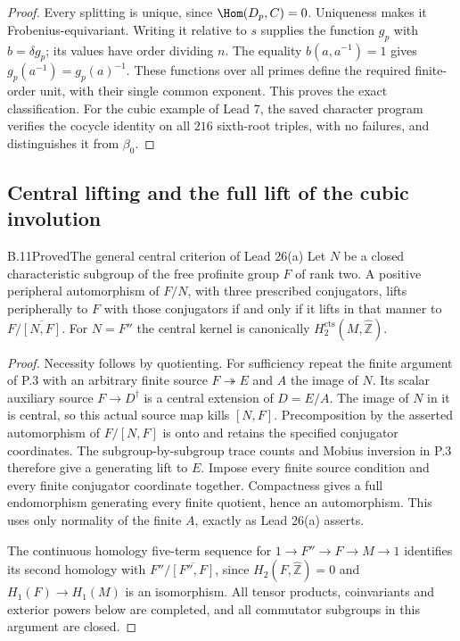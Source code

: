 \begin{proof}
Every splitting is unique, since $\Hom(D_p,C)=0$. Uniqueness makes
it Frobenius-equivariant. Writing it relative to $s$ supplies the
function $g_p$ with $b=\delta g_p$; its values have order dividing
$n$. The equality $b(a,a^{-1})=1$ gives
$g_p(a^{-1})=g_p(a)^{-1}$. These functions over all primes define
the required finite-order unit, with their single common exponent.
This proves the exact classification. For the cubic example of
Lead 7, the saved character program verifies the cocycle identity
on all $216$ sixth-root triples, with no failures, and distinguishes
it from $\beta_0$.
\end{proof}

\subsection{Central lifting and the full lift of the cubic involution}

\begin{statement}{B.11}{Proved}{The general central criterion of Lead 26(a)}
Let $N$ be a closed characteristic subgroup of the free profinite
group $F$ of rank two. A positive peripheral automorphism of $F/N$,
with three prescribed conjugators, lifts peripherally to $F$ with
those conjugators if and only if it lifts in that manner to
$F/\overline{[N,F]}$. For $N=F''$ the central kernel is canonically
$H_2^{\mathrm{cts}}(M,\widehat{\mathbb Z})$.
\end{statement}
\begin{proof}
Necessity follows by quotienting. For sufficiency repeat the finite
argument of P.3 with an arbitrary finite source $F\twoheadrightarrow E$
and $A$ the image of $N$. Its scalar auxiliary source
$F\to D^\dagger$ is a central extension of $D=E/A$.
The image of $N$ in it is central, so this actual source map kills
$[N,F]$. Precomposition by the asserted automorphism of
$F/[N,F]$ is onto and retains the specified conjugator coordinates.
The subgroup-by-subgroup trace counts and Mobius inversion in P.3
therefore give a generating lift to $E$. Impose every finite source
condition and every finite conjugator coordinate together.
Compactness gives a full endomorphism generating every finite
quotient, hence an automorphism. This uses only normality of the
finite $A$, exactly as Lead 26(a) asserts.

The continuous homology five-term sequence for
$1\to F''\to F\to M\to1$ identifies its second homology with
$F''/\overline{[F'',F]}$, since $H_2(F,\widehat{\mathbb Z})=0$
and $H_1(F)\to H_1(M)$ is an isomorphism. All tensor products,
coinvariants and exterior powers below are completed, and all
commutator subgroups in this argument are closed.
\end{proof}

